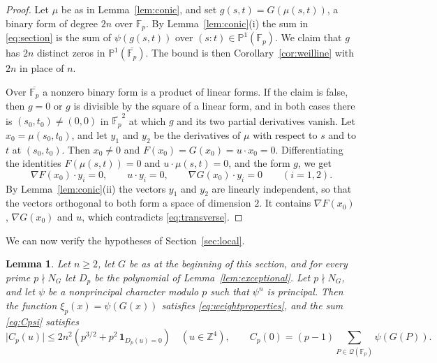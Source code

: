\documentclass[11pt]{amsart}
\numberwithin{equation}{section}
\numberwithin{figure}{section}
\newtheorem{lemma}{Lemma}[section]
\theoremstyle{definition}
\newcommand{\Z}{\mathbb{Z}}
\newcommand{\abs}[1]{\lvert #1\rvert}
\newcommand{\Fp}{\mathbb F_p}
\newcommand{\PP}{\mathbb P}
\newcommand{\Qc}{\mathcal Q}
\begin{document}
\begin{proof}
Let $\mu$ be as in Lemma~\ref{lem:conic}, and set
$g(s,t)=G(\mu(s,t))$, a binary form of degree $2n$ over $\Fp$. By
Lemma~\ref{lem:conic}(i) the sum in \eqref{eq:section} is the sum of
$\psi(g(s,t))$ over $(s:t)\in\PP^1(\Fp)$. We claim that $g$ has $2n$
distinct zeros in $\PP^1(\overline{\Fp})$. The bound is then
Corollary~\ref{cor:weilline} with $2n$ in place of $n$.

Over $\overline{\Fp}$ a nonzero binary form is a product of linear
forms. If the claim is false, then $g=0$ or $g$ is divisible by the
square of a linear form, and in both cases there is
$(s_0,t_0)\ne(0,0)$ in $\overline{\Fp}^2$ at which $g$ and its two
partial derivatives vanish. Let $x_0=\mu(s_0,t_0)$, and let $y_1$ and
$y_2$ be the derivatives of $\mu$ with respect to $s$ and to $t$ at
$(s_0,t_0)$. Then $x_0\ne0$ and $F(x_0)=G(x_0)=u\cdot x_0=0$.
Differentiating the identities $F(\mu(s,t))=0$ and
$u\cdot\mu(s,t)=0$, and the form $g$, we get
\[
 \nabla F(x_0)\cdot y_i=0,\qquad u\cdot y_i=0,\qquad
 \nabla G(x_0)\cdot y_i=0\qquad(i=1,2).
\]
By Lemma~\ref{lem:conic}(ii) the vectors $y_1$ and $y_2$ are linearly
independent, so that the vectors orthogonal to both form a space of
dimension $2$. It contains $\nabla F(x_0)$, $\nabla G(x_0)$ and $u$,
which contradicts \eqref{eq:transverse}.
\end{proof}

We can now verify the hypotheses of Section~\ref{sec:local}.

\begin{lemma}\label{lem:fourier}
Let $n\ge2$, let $G$ be as at the beginning of this section, and for
every prime $p\nmid N_G$ let $D_p$ be the polynomial of
Lemma~\ref{lem:exceptional}. Let $p\nmid N_G$, and let $\psi$ be a
nonprincipal character modulo $p$ such that $\psi^n$ is principal.
Then the function $\xi_p(x)=\psi(G(x))$ satisfies
\eqref{eq:weightproperties}, and the sum \eqref{eq:Cpsi} satisfies
\begin{equation}\label{eq:fourier}
 \abs{C_p(u)}\le2n^2(p^{3/2}+p^2\,\mathbf 1_{D_p(u)=0})
 \quad(u\in\Z^4),\qquad
 C_p(0)=(p-1)\sum_{P\in\Qc(\Fp)}\psi(G(P)).
\end{equation}
\end{lemma}
\end{document}
